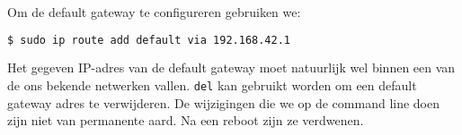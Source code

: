 Om de default gateway te configureren gebruiken we:
\begin{lstlisting}[language=bash]
$ sudo ip route add default via 192.168.42.1
\end{lstlisting}
Het gegeven IP-adres van de default gateway moet natuurlijk wel binnen een van de ons bekende netwerken vallen. \texttt{del} kan gebruikt worden om een default gateway adres te verwijderen. De wijzigingen die we op de command line doen zijn niet van permanente aard. Na een reboot zijn ze verdwenen.

